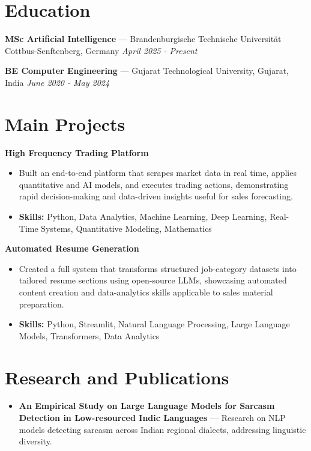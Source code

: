 \documentclass[a4paper,10pt]{article}
\begin{document}
\section*{Education}
\textbf{MSc Artificial Intelligence} — Brandenburgische Technische Universität Cottbus-Senftenberg, Germany \hfill \textit{April 2025 - Present}\par
\vspace{1.5pt}
\textbf{BE Computer Engineering} — Gujarat Technological University, Gujarat, India \hfill \textit{June 2020 - May 2024}\par

\section*{Main Projects}
\textbf{High Frequency Trading Platform}\par
\vspace{1pt}
\begin{itemize}
  \item Built an end-to-end platform that scrapes market data in real time, applies quantitative and AI models, and executes trading actions, demonstrating rapid decision-making and data-driven insights useful for sales forecasting.
  \item \textbf{Skills:} Python, Data Analytics, Machine Learning, Deep Learning, Real-Time Systems, Quantitative Modeling, Mathematics
\end{itemize}
\vspace{3pt}
\textbf{Automated Resume Generation}\par
\vspace{1pt}
\begin{itemize}
  \item Created a full system that transforms structured job-category datasets into tailored resume sections using open-source LLMs, showcasing automated content creation and data-analytics skills applicable to sales material preparation.
  \item \textbf{Skills:} Python, Streamlit, Natural Language Processing, Large Language Models, Transformers, Data Analytics
\end{itemize}

\section*{Research and Publications}
\begin{itemize}
\item \textbf{An Empirical Study on Large Language Models for Sarcasm Detection in Low-resourced Indic Languages} — Research on NLP models detecting sarcasm across Indian regional dialects, addressing linguistic diversity.
\end{itemize}
\end{document}
